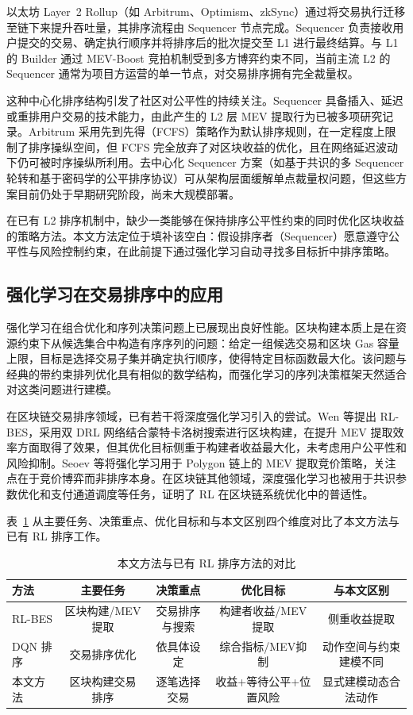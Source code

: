 以太坊 Layer~2 Rollup（如 Arbitrum、Optimism、zkSync）通过将交易执行迁移至链下来提升吞吐量，其排序流程由 Sequencer 节点完成。Sequencer 负责接收用户提交的交易、确定执行顺序并将排序后的批次提交至 L1 进行最终结算。与 L1 的 Builder 通过 MEV-Boost 竞拍机制受到多方博弈约束不同，当前主流 L2 的 Sequencer 通常为项目方运营的单一节点，对交易排序拥有完全裁量权。

这种中心化排序结构引发了社区对公平性的持续关注。Sequencer 具备插入、延迟或重排用户交易的技术能力，由此产生的 L2 层 MEV 提取行为已被多项研究记录。Arbitrum 采用先到先得（FCFS）策略作为默认排序规则，在一定程度上限制了排序操纵空间，但 FCFS 完全放弃了对区块收益的优化，且在网络延迟波动下仍可被时序操纵所利用。去中心化 Sequencer 方案（如基于共识的多 Sequencer 轮转和基于密码学的公平排序协议）可从架构层面缓解单点裁量权问题，但这些方案目前仍处于早期研究阶段，尚未大规模部署。

在已有 L2 排序机制中，缺少一类能够在保持排序公平性约束的同时优化区块收益的策略方法。本文方法定位于填补该空白：假设排序者（Sequencer）愿意遵守公平性与风险控制约束，在此前提下通过强化学习自动寻找多目标折中排序策略。

\subsection{强化学习在交易排序中的应用}

强化学习在组合优化和序列决策问题上已展现出良好性能\cite{sutton2018rl}。区块构建本质上是在资源约束下从候选集合中构造有序序列的问题：给定一组候选交易和区块 Gas 容量上限，目标是选择交易子集并确定执行顺序，使得特定目标函数最大化。该问题与经典的带约束排列优化具有相似的数学结构，而强化学习的序列决策框架天然适合对这类问题进行建模。

在区块链交易排序领域，已有若干将深度强化学习引入的尝试。Wen 等\cite{wen2025rlbes}提出 RL-BES，采用双 DRL 网络结合蒙特卡洛树搜索进行区块构建，在提升 MEV 提取效率方面取得了效果，但其优化目标侧重于构建者收益最大化，未考虑用户公平性和风险抑制。Seoev 等\cite{seoev2025bidding}将强化学习用于 Polygon 链上的 MEV 提取竞价策略，关注点在于竞价博弈而非排序本身。在区块链其他领域，深度强化学习也被用于共识参数优化\cite{zou2023consensus}和支付通道调度\cite{ren2024payment}等任务，证明了 RL 在区块链系统优化中的普适性。

表~\ref{tab:comparison} 从主要任务、决策重点、优化目标和与本文区别四个维度对比了本文方法与已有 RL 排序工作。

\begin{table}[htbp]
\centering
\caption{本文方法与已有 RL 排序方法的对比}
\label{tab:comparison}
\begin{tabular}{lcccc}
\toprule
方法 & 主要任务 & 决策重点 & 优化目标 & 与本文区别 \\
\midrule
RL-BES\cite{wen2025rlbes} & 区块构建/MEV提取 & 交易排序与搜索 & 构建者收益/MEV提取 & 侧重收益提取 \\
DQN 排序 & 交易排序优化 & 依具体设定 & 综合指标/MEV抑制 & 动作空间与约束建模不同 \\
本文方法 & 区块构建交易排序 & 逐笔选择交易 & 收益+等待公平+位置风险 & 显式建模动态合法动作 \\
\bottomrule
\end{tabular}
\end{table}

